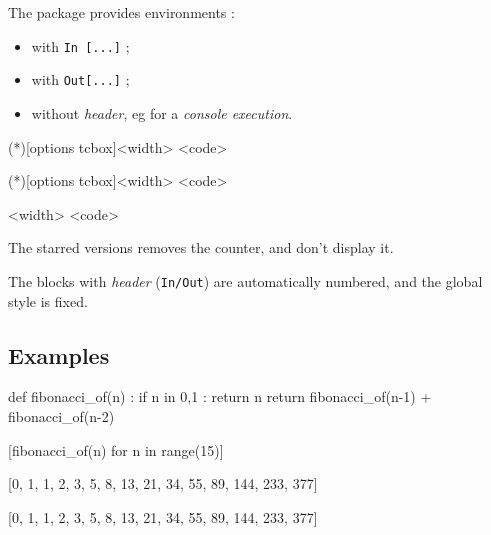 \documentclass[english,11pt,a4paper]{article}
\begin{document}
The package provides environments :

\begin{itemize}
	\item with \texttt{In~[...]} ;
	\item with \texttt{Out[...]} ;
	\item without \textit{header}, eg for a \textit{console execution}.
\end{itemize}

\begin{codehigh}[language=latex/latex2,style/main=cyan!10,style/code=cyan!10]
\begin{NotebookIn}(*)[options tcbox]{<width>}
<code>
\end{NotebookIn}
\end{codehigh}

\begin{codehigh}[language=latex/latex2,style/main=cyan!10,style/code=cyan!10]
\begin{NotebookOut}(*)[options tcbox]{<width>}
<code>
\end{NotebookOut}
\end{codehigh}

\begin{codehigh}[language=latex/latex2,style/main=cyan!10,style/code=cyan!10]
\begin{NotebookConsole}{<width>}
<code>
\end{NotebookConsole}
\end{codehigh}

The starred versions removes the counter, and don't display it.

The blocks with \textit{header} (\texttt{In/Out}) are automatically numbered, and the global style is fixed.

\subsection{Examples}

\begin{codehigh}[language=latex/latex2,style/main=cyan!10,style/code=cyan!10]
\begin{NotebookIn}{\linewidth}
def fibonacci_of(n) :
  if n in {0,1} :
    return n
  return fibonacci_of(n-1) + fibonacci_of(n-2)

[fibonacci_of(n) for n in range(15)]
\end{NotebookIn}

\begin{NotebookOut}{\linewidth}
[0, 1, 1, 2, 3, 5, 8, 13, 21, 34, 55, 89, 144, 233, 377]
\end{NotebookOut}

\begin{NotebookConsole}{\linewidth}
[0, 1, 1, 2, 3, 5, 8, 13, 21, 34, 55, 89, 144, 233, 377]
\end{NotebookConsole}
\end{codehigh}
\end{document}
